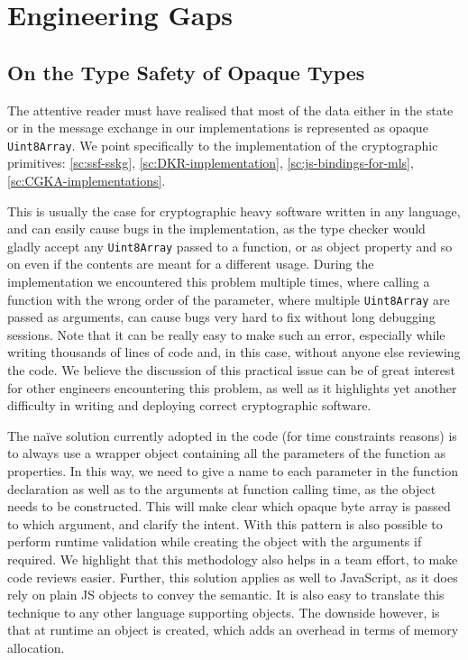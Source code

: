 \chapter{Engineering Gaps}\label{ch:gaps}



\section{On the Type Safety of Opaque Types}\label{sc:gap-type-safety-of-opaque-byte-arrays}
The attentive reader must have realised that most of the data either in the state
or in the message exchange in our implementations is represented as opaque \texttt{Uint8Array}.
We point specifically to the implementation of the cryptographic primitives:
\cref{sc:ssf-sskg}, \cref{sc:DKR-implementation}, \cref{sc:js-bindings-for-mls}, \cref{sc:CGKA-implementations}.

This is usually the case for cryptographic heavy software written in any language, 
and can easily cause bugs in the implementation, as the type checker
would gladly accept any \texttt{Uint8Array} passed to a function, or as object 
property and so on even if the contents are meant for a different usage. 
During the implementation we encountered this problem multiple times,
where calling a function with the wrong order of the parameter, where
multiple \texttt{Uint8Array} are passed as arguments, can cause bugs
very hard to fix without long debugging sessions. Note that it can be
really easy to make such an error, especially while writing thousands
of lines of code and, in this case, without anyone else reviewing the code.
We believe the discussion of this practical issue can be of great interest for other
engineers encountering this problem, as well as it highlights yet another
difficulty in writing and deploying correct cryptographic software.

The na\"ive solution currently adopted in the code (for time constraints reasons)
is to always use a wrapper object containing all the parameters of the function
as properties. In this way, we need to give a name to each parameter
in the function declaration as well as to the arguments at function calling
time, as the object needs to be constructed. This will make clear which
opaque byte array is passed to which argument, and clarify the intent.
With this pattern is also possible to perform runtime validation
while creating the object with the arguments if required.
We highlight that this methodology also helps in a team effort, to make
code reviews easier. Further, this solution applies as well to JavaScript,
as it does rely on plain JS objects to convey the semantic. It is also
easy to translate this technique to any other language supporting objects.
The downside however, is that at runtime an object is created, which adds 
an overhead in terms of memory allocation.

